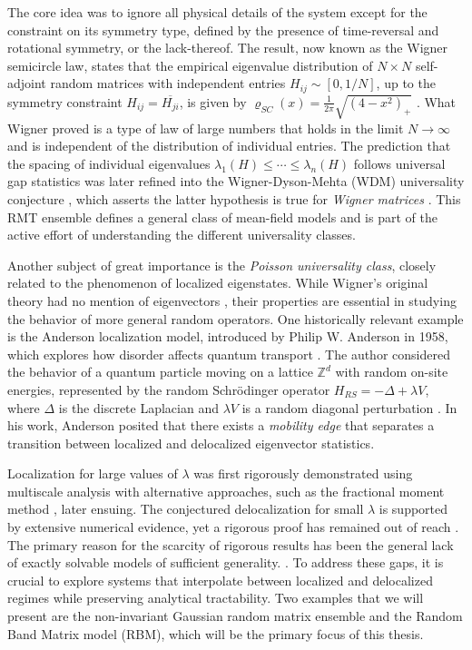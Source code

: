 \documentclass[11pt]{article}
\newcommand{\Z}{\mathbb{Z}}
\begin{document}
\vspace{0.5cm}
\noindent The core idea was to ignore all physical details of the system except for the constraint on its symmetry type, defined by the presence of time-reversal and rotational symmetry, or the lack-thereof. The result, now known as the Wigner semicircle law, states that the empirical eigenvalue distribution of \( N \times N \) self-adjoint random matrices with independent entries $H_{ij}\sim [0, 1/N]$, up to the symmetry constraint $H_{ij} = \overline{H_{ji}}$, is given by $\varrho_{SC}(x)=\frac{1}{2\pi} \sqrt{(4-x^2)_+}$ \cite{dynamic}. What Wigner proved is a type of law of large numbers that holds in the limit \( N \to \infty \) and is independent of the distribution of individual entries. The prediction that the spacing of individual eigenvalues $\lambda_1(H)\leq \cdots \leq \lambda_n(H)$ follows universal gap statistics was later refined into the Wigner-Dyson-Mehta (WDM) universality conjecture \cite{mehta}, which asserts the latter hypothesis is true for \textit{Wigner matrices} \cite{taoWDM}. This RMT ensemble defines a general class of mean-field models and is part of the active effort of understanding the different universality classes. 

\vspace{0.5 cm}
\noindent Another subject of great importance is the \textit{Poisson universality class}, closely related to the phenomenon of localized eigenstates. While Wigner's original theory had no mention of eigenvectors \cite{7}, their properties are essential in studying the behavior of more general random operators. One historically relevant example is the Anderson localization model, introduced by Philip W. Anderson in 1958, which explores how disorder affects quantum transport \cite{anderson}. The author considered the behavior of a quantum particle moving on a lattice $\Z^d$ with random on-site energies, represented by the random Schrödinger operator \( H_{RS}=-\Delta + \lambda V \), where \( \Delta \) is the discrete Laplacian and \( \lambda V \) is a random diagonal perturbation \cite{randomoperators}. In his work, Anderson posited that there exists a \textit{mobility edge} that separates a transition between localized and delocalized eigenvector statistics. 
\vspace{0.5 cm}

\noindent Localization for large values of $\lambda$ was first rigorously demonstrated using multiscale analysis \cite{24} with alternative approaches, such as the fractional moment method \cite{1}, later ensuing. The conjectured delocalization for small $\lambda$ is supported by extensive numerical evidence, yet a rigorous proof has remained out of reach \cite{bandSDE}. The primary reason for the scarcity of rigorous results has been the general lack of exactly solvable models of sufficient generality. \cite{kravtsov2009}.  To address these gaps, it is crucial to explore systems that interpolate between localized and delocalized regimes while preserving analytical tractability. Two examples that we will present are the non-invariant Gaussian random matrix ensemble and the Random Band Matrix model (RBM), which will be the primary focus of this thesis. 
\end{document}
